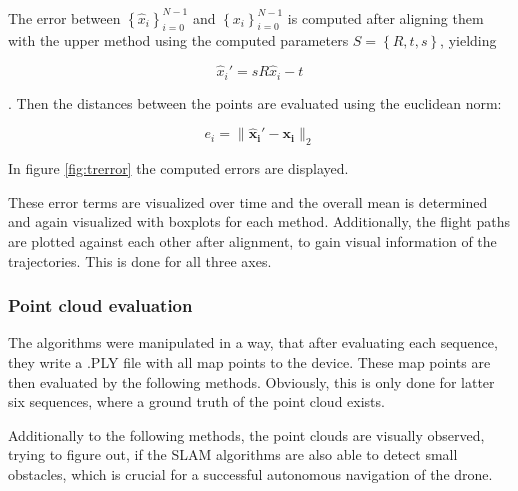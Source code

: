 \begin{enumerate}
	The error between $\left\{{\widehat{x}_i}\right\}_{i=0}^{N-1}$ and $\left\{{x_i}\right\}_{i=0}^{N-1}$ is computed after aligning them 
	with the upper method using the computed parameters $S = \left\{R,t,s\right\}$, yielding
	
	$$ \widehat{x}_i' = sR\widehat{x}_i - t $$
	
	. Then the distances between the points are evaluated using the euclidean norm: 
	
	$$ e_i = \lVert \mathbf{\widehat{x}_i' - x_i} \rVert_2$$
	
	
	In figure \ref{fig:trerror} the computed errors are displayed. 
	
	
	These error terms are visualized over time and the overall mean is determined and again visualized with boxplots for each method.
	Additionally, the flight paths are plotted against each other after alignment, to gain visual information of the trajectories. 
	This is done for all three axes. 

	
	\end{enumerate}
	
\subsubsection{Point cloud evaluation}

The algorithms were manipulated in a way, that after evaluating each sequence, they write a .PLY file with all map points to 
the device. These map points are then evaluated by the following methods. Obviously, this is only done for  latter six sequences, 
where a ground truth of the point cloud exists. 

Additionally to the following methods, the point clouds are visually observed, 
trying to figure out, if the SLAM algorithms are also able to detect small obstacles, which is crucial for a successful autonomous
 navigation of the drone. 
	
